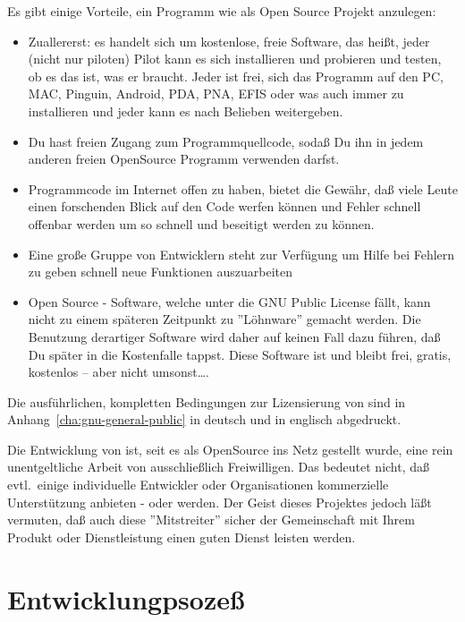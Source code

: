 Es gibt einige Vorteile, ein Programm wie \xc als Open Source Projekt anzulegen:

\begin{itemize}
\item Zuallererst: es handelt sich um kostenlose, freie Software, das heißt, jeder (nicht nur piloten) Pilot kann es sich installieren und probieren und testen,
ob es das ist, was er braucht. Jeder ist frei, sich das Programm auf den PC, MAC, Pinguin, Android, PDA, PNA, EFIS  oder was auch immer zu installieren
und jeder kann es nach Belieben weitergeben.

\item Du hast freien Zugang zum Programmquellcode, sodaß Du ihn in jedem anderen freien OpenSource Programm verwenden darfst.

\item Programmcode im Internet offen zu haben, bietet die Gewähr, daß viele Leute einen forschenden Blick auf den Code werfen können und Fehler schnell offenbar 
werden um so schnell und beseitigt werden zu können.

\item  Eine große Gruppe von Entwicklern steht zur Verfügung um Hilfe bei Fehlern zu geben schnell neue Funktionen auszuarbeiten

\item Open Source - Software, welche unter die GNU Public License fällt, kann nicht zu einem späteren Zeitpunkt zu ''Löhnware'' 
gemacht werden. Die Benutzung derartiger Software wird daher auf keinen Fall dazu führen, daß Du später in die Kostenfalle tappst.
Diese Software ist und bleibt frei, gratis, kostenlos -- aber nicht umsonst\dots.

\end{itemize}

Die ausführlichen, kompletten Bedingungen zur Lizensierung von \xc sind in Anhang~\ref{cha:gnu-general-public} in deutsch und in englisch abgedruckt.

Die Entwicklung von \xc ist, seit es als OpenSource ins Netz gestellt wurde, eine rein unentgeltliche Arbeit von ausschließlich Freiwilligen.
Das bedeutet nicht, daß evtl.\  einige individuelle Entwickler oder Organisationen  kommerzielle Unterstützung anbieten - oder werden.
Der Geist dieses Projektes jedoch läßt vermuten, daß auch diese  ''Mitstreiter'' sicher der Gemeinschaft
mit Ihrem Produkt oder Dienstleistung einen guten Dienst leisten werden.


\section{Entwicklungpsozeß}

